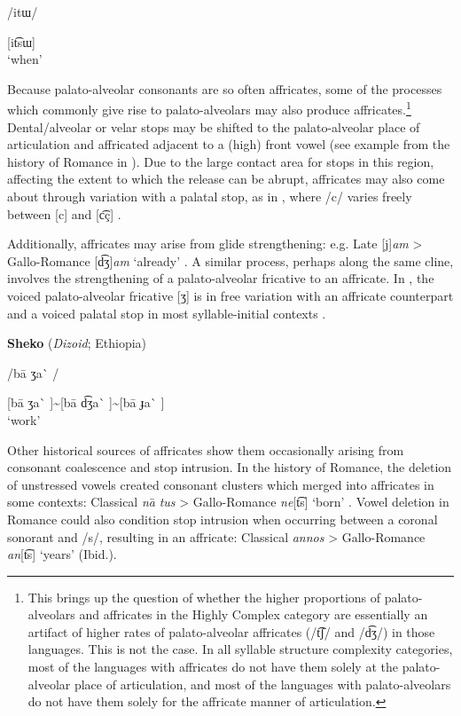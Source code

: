/itɯ/

[it͡sɯ]\\
\glt ‘when’
\citep[22]{Tsujimura2013}
\z

  Because palato-alveolar consonants are so often affricates, some of the processes which commonly give rise to palato-alveolars may also produce affricates.\footnote{{This brings up the question of whether the higher proportions of palato-alveolars and affricates in the Highly Complex category are essentially an artifact of higher rates of palato-alveolar affricates (/t͡ʃ/ and /d͡ʒ/) in those languages. This is not the case. In all syllable structure complexity categories, most of the languages with affricates do not have them solely at the palato-alveolar place of articulation, and most of the languages with palato-alveolars do not have them solely for the affricate manner of articulation.}} Dental/alveolar or velar stops may be shifted to the palato-alveolar place of articulation and affricated adjacent to a (high) front vowel (see example from the history of Romance in ). Due to the large contact area for stops in this region, affecting the extent to which the release can be abrupt, affricates may also come about through variation with a palatal stop, as in , where /c/ varies freely between [c] and [c͡ç] \citep[17-18]{Hanson2010}.

  Additionally, affricates may arise from glide strengthening: e.g. Late  [j]\textit{am} > Gallo-Romance [d͡ʒ]\textit{am} ‘already’ \citep[132]{Berns2013}. A similar process, perhaps along the same cline, involves the strengthening of a palato-alveolar fricative to an affricate. In , the voiced palato-alveolar fricative [ʒ] is in free variation with an affricate counterpart and a voiced palatal stop in most syllable-initial contexts .

\ea\label{ex:4.46}
  \textbf{Sheko} (\textit{Dizoid}; Ethiopia)

/ba\={} ʒa\`{} /

[ba\={} ʒa\`{} ]{\textasciitilde}[ba\={} d͡ʒa\`{} ]{\textasciitilde}[ba\={} ɟa\`{} ]\\
\glt ‘work’
\citep[86]{Hellenthal2010}
\z

  Other historical sources of affricates show them occasionally arising from consonant coalescence and stop intrusion. In the history of Romance, the deletion of unstressed vowels created consonant clusters which merged into affricates in some contexts: Classical  \textit{na}\textsf{\={} }\textit{tus} > Gallo-Romance \textit{ne}[t͡s] ‘born’ \citep[128]{Berns2013}. Vowel deletion in Romance could also condition stop intrusion when occurring between a coronal sonorant and /s/, resulting in an affricate: Classical  \textit{annos} > Gallo-Romance \textit{an}[t͡s] ‘years’ (Ibid.).

